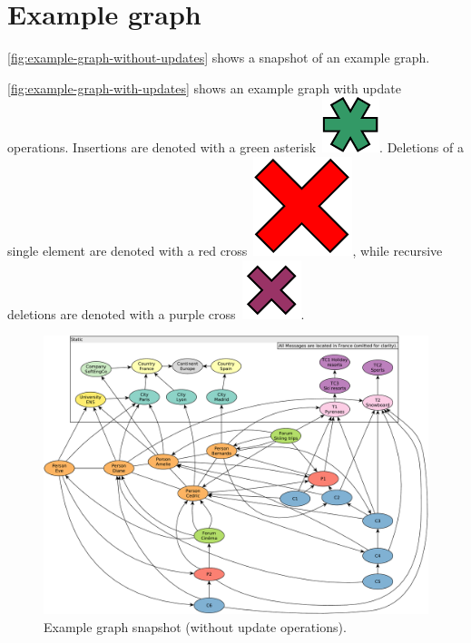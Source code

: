 \chapter{Example graph}
\label{sec:example-graph}

\autoref{fig:example-graph-without-updates} shows a snapshot of an example graph.

\autoref{fig:example-graph-with-updates} shows an example graph with update operations.
Insertions are denoted with a green asterisk~\includegraphics[scale=0.25]{patterns/insert}.
Deletions of a single element are denoted with a red cross~\includegraphics[scale=0.25]{patterns/delete-single},
while recursive deletions are denoted with a purple cross~\includegraphics[scale=0.25]{patterns/delete-recursively}.

\begin{figure}[ht]
    \centering
    \includegraphics[scale=\yedscale]{figures/example-graph-without-updates}
    \caption{Example graph snapshot (without update operations).}
    \label{fig:example-graph-without-updates}
\end{figure}


